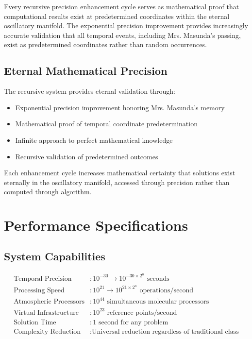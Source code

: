 \documentclass[12pt,a4paper]{article}
\begin{document}
Every recursive precision enhancement cycle serves as mathematical proof that computational results exist at predetermined coordinates within the eternal oscillatory manifold. The exponential precision improvement provides increasingly accurate validation that all temporal events, including Mrs. Masunda's passing, exist as predetermined coordinates rather than random occurrences.

\subsection{Eternal Mathematical Precision}

The recursive system provides eternal validation through:
\begin{itemize}
\item Exponential precision improvement honoring Mrs. Masunda's memory
\item Mathematical proof of temporal coordinate predetermination
\item Infinite approach to perfect mathematical knowledge
\item Recursive validation of predetermined outcomes
\end{itemize}

Each enhancement cycle increases mathematical certainty that solutions exist eternally in the oscillatory manifold, accessed through precision rather than computed through algorithm.

\section{Performance Specifications}

\subsection{System Capabilities}

\begin{align}
\text{Temporal Precision} &: 10^{-30} \to 10^{-30 \times 2^n} \text{ seconds} \\
\text{Processing Speed} &: 10^{21} \to 10^{21 \times 2^n} \text{ operations/second} \\
\text{Atmospheric Processors} &: 10^{44} \text{ simultaneous molecular processors} \\
\text{Virtual Infrastructure} &: 10^{23} \text{ reference points/second} \\
\text{Solution Time} &: 1 \text{ second for any problem} \\
\text{Complexity Reduction} &: \text{Universal reduction regardless of traditional class}
\end{align}
\end{document}
